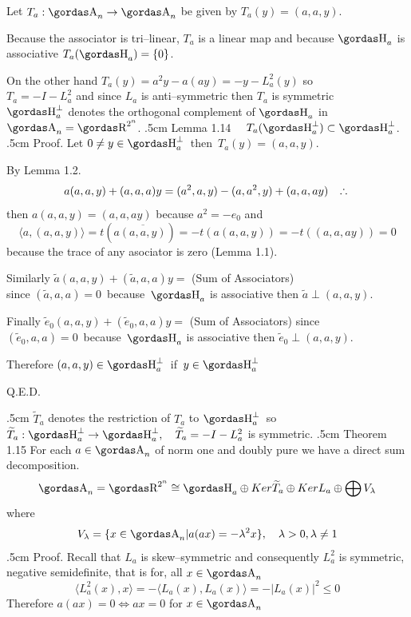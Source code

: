 \par 
Let $T_{a}:\a_{n}\rightarrow \a_{n}$ be given by $T_{a}(y)=(a,a,y)$.
\par 
Because the associator is tri--linear, $T_{a}$ is a linear map and because 
$\ache_{a}$ is associative $T_{a}(\ache_{a})=\{0\}$.
\par 
On the other hand $T_{a}(y)=a^{2}y-a(ay)=-y-L^{2}_{a}(y)$ so\\
$T_{a}=-I-L^{2}_{a}$ and since $L_{a}$ 
is anti--symmetric then $T_{a}$ is symmetric \\
$\ache^{\perp}_{a}$ denotes the orthogonal complement of $\ache_{a}$ in
$\a_{n}=\erre^{2^n}$.
\vglue.5cm
\noindent
{\bsbf Lemma 1.14} $\quad T_{a}(\ache^{\perp}_{a})\subset \ache^{\perp}_{a}$.
\vglue.5cm
\noindent
{\bsbf Proof.} Let $0\neq y\in \ache_{a}^{\perp}\,$ then $\,T_{a}(y)=(a,a,y)$.
\par 
By Lemma 1.2.
$$a(a,a,y)+(a,a,a)y=(a^{2},a,y)-(a,a^{2},y)+(a,a,ay)\quad\triangulo$$
then $a(a,a,y)=(a,a,ay)$ because $a^{2}=-e_{0}$ and
$$\langle a,(a,a,y)\rangle =t(a\overline{(a,a,y)})=-t(a(a,a,y))=-t((a,a,ay))=0$$
because the trace of any asociator is zero (Lemma 1.1).
\par 
Similarly 
$\widetilde{a}(a,a,y)+(\widetilde{a},a,a)y=$ (Sum of Associators)  \\
since
$(\widetilde{a},a,a)=0\,$ because $\,\ache_{a}$ is associative then
$\widetilde{a}\perp (a,a,y)$.
\par 
Finally $\widetilde{e}_{0}(a,a,y)+(\widetilde{e}_{0},a,a)y=$ (Sum of Associators) 
since \\
$(\widetilde{e}_{0},a,a)=0\,$ because $\,\ache_{a}$ is associative then
$\widetilde{e}_{0}\perp (a,a,y)$.
\par 
Therefore $(a,a,y)\in \ache^{\perp}_{a}\,$ if $\,y\in \ache^{\perp}_{a}$
\begin{flushright}
Q.E.D.
\end{flushright}
\vglue.5cm
\noindent
$\widetilde{T}_{a}$ denotes the restriction of $T_{a}$ to $\ache_{a}^{\perp}\,$ so\\
$\widetilde{T}_{a}:\ache^{\perp}_{a}\rightarrow \ache^{\perp}_{a},\quad
\widetilde{T}_{a}=-I-L^{2}_{a}$ 
is symmetric.
\vglue.5cm
\noindent
{\bsbf Theorem 1.15} For each $a\in \a_{n}$ of norm one and doubly pure we have a 
direct sum decomposition.
$$\a_{n}=\erre^{2^n}\cong\ache_{a}\oplus Ker\widetilde{T}_{a}\oplus Ker L_{a}
\oplus \bigoplus V_{\lambda}$$
where
$$V_{\lambda}=\{x\in \a_{n}|a(ax)=-\lambda^{2}x\},
\quad\lambda>0,\lambda\neq 1$$
\vglue.5cm
\noindent
{\bsbf Proof.} Recall that $L_{a}$ is skew--symmetric and consequently $L^{2}_{a}$
is symmetric, negative semidefinite, that is for, all $x\in \a_{n}$%
$$\langle L^{2}_{a}(x),x\rangle=-\langle L_{a}(x), L_{a}(x)\rangle=-
|L_{a}(x)|^{2}\le 0$$
Therefore $a(ax)=0 \Leftrightarrow ax=0$ for $x\in \a_{n}$


